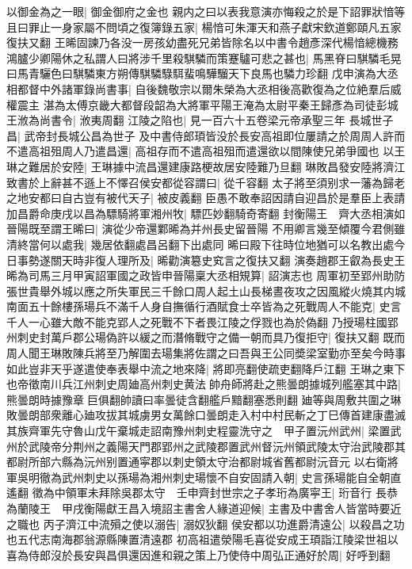以御金為之一眼|{
	御金御府之金也}
親内之曰以表我意演亦悔殺之於是下詔罪狀愔等且曰罪止一身家屬不問頃之復簿錄五家|{
	楊愔可朱渾天和燕子獻宋欽道鄭頤凡五家復扶又翻}
王晞固諫乃各没一房孩幼盡死兄弟皆除名以中書令趙彥深代楊愔總機務鴻臚少卿陽休之私謂人曰將涉千里殺騏驎而策蹇驢可悲之甚也|{
	馬黑脊曰騏驎毛晃曰馬青驪色曰騏驎東方朔傳騏驎騄駬蜚鳴驊騮天下良馬也驎力珍翻}
戊申演為大丞相都督中外諸軍錄尚書事|{
	自後魏敬宗以爾朱榮為大丞相後高歡復為之位絶羣后威權震主}
湛為太傅京畿大都督段韶為大將軍平陽王淹為太尉平秦王歸彥為司徒彭城王浟為尚書令|{
	浟夷周翻}
江陵之陷也|{
	見一百六十五卷梁元帝承聖三年}
長城世子昌|{
	武帝封長城公昌為世子}
及中書侍郎頊皆没於長安高祖即位屢請之於周周人許而不遣高祖殂周人乃遣昌還|{
	高祖存而不遣高祖殂而遣還欲以間陳使兄弟爭國也}
以王琳之難居於安陸|{
	王琳據中流昌還建康路梗故居安陸難乃旦翻}
琳敗昌發安陸將濟江致書於上辭甚不遜上不懌召侯安都從容謂曰|{
	從千容翻}
太子將至須别求一藩為歸老之地安都曰自古豈有被代天子|{
	被皮義翻}
臣愚不敢奉詔因請自迎昌於是羣臣上表請加昌爵命庚戌以昌為驃騎將軍湘州牧|{
	驃匹妙翻騎奇寄翻}
封衡陽王　齊大丞相演如晉陽既至謂王晞曰|{
	演從少帝還鄴晞為并州長史留晉陽}
不用卿言幾至傾覆今君側雖清終當何以處我|{
	幾居依翻處昌呂翻下出處同}
晞曰殿下往時位地猶可以名教出處今日事勢遂關天時非復人理所及|{
	晞勸演簒史䆒言之復扶又翻}
演奏趙郡王叡為長史王晞為司馬三月甲寅詔軍國之政皆申晉陽稟大丞相䂓算|{
	詔演志也}
周軍初至郢州助防張世貴舉外城以應之所失軍民三千餘口周人起土山長梯晝夜攻之因風縱火燒其内城南面五十餘樓孫瑒兵不滿千人身自撫循行酒賦食士卒皆為之死戰周人不能克|{
	史言千人一心雖大敵不能克郢人之死戰不下者畏江陵之俘戮也為於偽翻}
乃授瑒柱國郢州刺史封萬戶郡公瑒偽許以緩之而潛脩戰守之備一朝而具乃復拒守|{
	復扶又翻}
既而周人聞王琳敗陳兵將至乃解圍去瑒集將佐謂之曰吾與王公同奬梁室勤亦至矣今時事如此豈非天乎遂遣使奉表舉中流之地來降|{
	將即亮翻使疏吏翻降戶江翻}
王琳之東下也帝徵南川兵江州刺史周廸高州刺史黄法帥舟師將赴之熊曇朗據城列艦塞其中路|{
	熊曇朗時據豫章巨俱翻帥讀曰率曇徒含翻艦戶黯翻塞悉則翻}
廸等與周敷共圍之琳敗曇朗部衆離心廸攻拔其城虜男女萬餘口曇朗走入村中村民斬之丁巳傳首建康盡滅其族齊軍先守魯山戊午棄城走詔南豫州刺史程靈洗守之　甲子置沅州武州|{
	梁置武州於武陵帝分荆州之義陽天門郡郢州之武陵郡置武州督沅州領武陵太守治武陵郡其都尉所部六縣為沅州别置通寜郡以刺史領太守治都尉城省舊都尉沅音元}
以右衛將軍吳明徹為武州刺史以孫瑒為湘州刺史瑒懷不自安固請入朝|{
	史言孫瑒能自全朝直遙翻}
徵為中領軍未拜除吳郡太守　壬申齊封世宗之子孝珩為廣寜王|{
	珩音行}
長恭為蘭陵王　甲戌衡陽獻王昌入境詔主書舍人緣道迎候|{
	主書及中書舍人皆當時要近之職也}
丙子濟江中流殞之使以溺告|{
	溺奴狄翻}
侯安都以功進爵清遠公|{
	以殺昌之功也五代志南海郡翁源縣陳置清遠郡}
初高祖遣滎陽毛喜從安成王頊詣江陵梁世祖以喜為侍郎沒於長安與昌俱還因進和親之策上乃使侍中周弘正通好於周|{
	好呼到翻}
